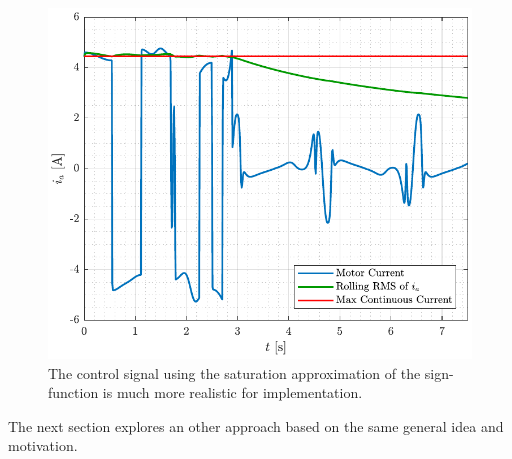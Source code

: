 %
\begin{figure}[H]
  \includegraphics[width=.52\textwidth]{figures/ia_3_noConX}
  \caption{The control signal using the saturation approximation of the sign-function is much more realistic for implementation.}
  \label{fig:ia_3_noConX}
\end{figure}
The next section explores an other approach based on the same general idea and motivation.
%
%

